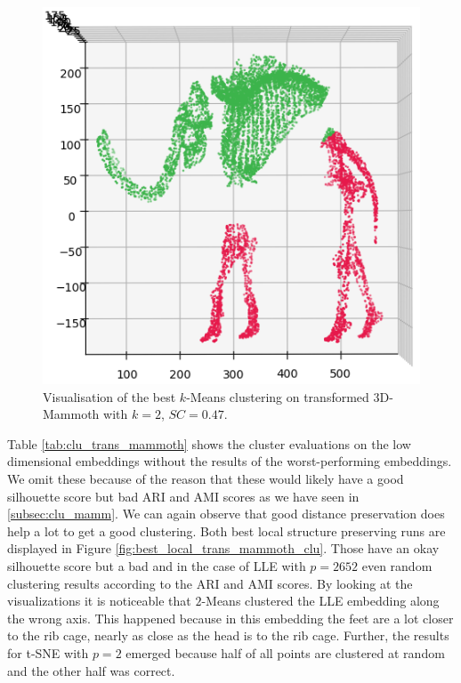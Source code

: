 \begin{figure}[!]
	\centering
	\includegraphics[width=0.5\columnwidth]{images/PLOT_trans_Mammoth_Kmeans2.png}
	\caption[Visualisation of Best Clustering for Transformed 3D-Mammoth]{Visualisation of the best $k$-Means clustering on transformed 3D-Mammoth with $k=2$, $SC=0.47$.}
    \label{fig:PLOT_trans_Mammoth_Kmeans2}
\end{figure}

Table \ref{tab:clu_trans_mammoth} shows the cluster evaluations on the low dimensional embeddings without the results of the worst-performing embeddings. We omit these because of the reason that these would likely have a good silhouette score but bad ARI and AMI scores as we have seen in \ref{subsec:clu_mamm}. We can again observe that good distance preservation does help a lot to get a good clustering. Both best local structure preserving runs are displayed in Figure \ref{fig:best_local_trans_mammoth_clu}. Those have an okay silhouette score but a bad and in the case of LLE with $p=2652$ even random clustering results according to the ARI and AMI scores. By looking at the visualizations it is noticeable that $2$-Means clustered the LLE embedding along the wrong axis. This happened because in this embedding the feet are a lot closer to the rib cage, nearly as close as the head is to the rib cage. Further, the results for t-SNE with $p=2$ emerged because half of all points are clustered at random and the other half was correct.

